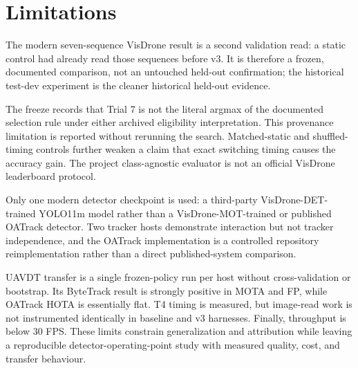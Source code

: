 \section{Limitations}
The modern seven-sequence VisDrone result is a second validation read: a static
control had already read those sequences before v3. It is therefore a frozen,
documented comparison, not an untouched held-out confirmation; the historical
test-dev experiment is the cleaner historical held-out evidence.

The freeze records that Trial 7 is not the literal argmax of the documented
selection rule under either archived eligibility interpretation. This provenance
limitation is reported without rerunning the search. Matched-static and
shuffled-timing controls further weaken a claim that exact switching timing
causes the accuracy gain. The project class-agnostic evaluator is not an
official VisDrone leaderboard protocol.

Only one modern detector checkpoint is used: a third-party
VisDrone-DET-trained YOLO11m model rather than a VisDrone-MOT-trained or
published OATrack detector. Two tracker hosts demonstrate interaction but not
tracker independence, and the OATrack implementation is a controlled
repository reimplementation rather than a direct published-system comparison.

UAVDT transfer is a single frozen-policy run per host without cross-validation
or bootstrap. Its ByteTrack result is strongly positive in MOTA and FP, while
OATrack HOTA is essentially flat. T4 timing is measured, but image-read work is
not instrumented identically in baseline and v3 harnesses. Finally, throughput
is below 30 FPS. These limits constrain generalization and attribution while
leaving a reproducible detector-operating-point study with measured quality,
cost, and transfer behaviour.
